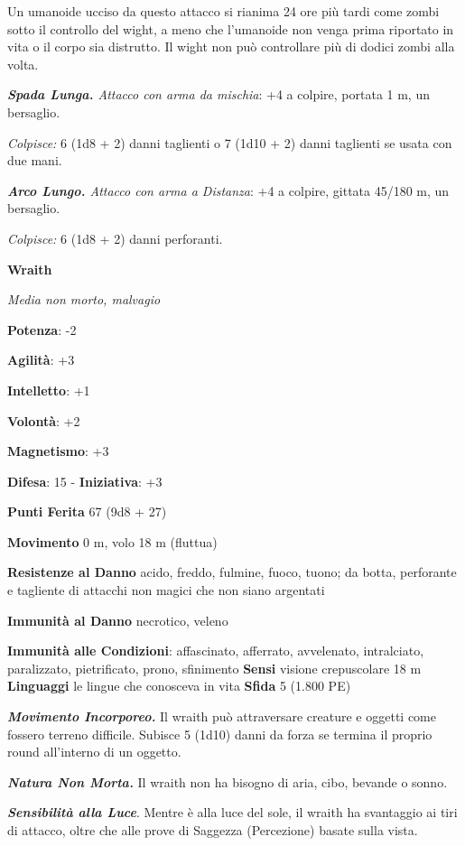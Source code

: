 \begin{multicols}{2}
Un umanoide ucciso da questo attacco si rianima 24 ore più tardi come
zombi sotto il controllo del wight, a meno che l'umanoide non venga
prima riportato in vita o il corpo sia distrutto. Il wight non può
controllare più di dodici zombi alla volta.

\emph{\textbf{Spada Lunga.} Attacco con arma da mischia}: +4 a colpire,
portata 1 m, un bersaglio.

\emph{Colpisce:} 6 (1d8 + 2) danni taglienti o 7 (1d10 + 2) danni
taglienti se usata con due mani.

\emph{\textbf{Arco Lungo.} Attacco con arma a Distanza}: +4 a colpire,
gittata 45/180 m, un bersaglio.

\emph{Colpisce:} 6 (1d8 + 2) danni perforanti.

\textbf{Wraith}

\emph{Media non morto, malvagio}

\textbf{Potenza}: -2

\textbf{Agilità}: +3

\textbf{Intelletto}: +1

\textbf{Volontà}: +2

\textbf{Magnetismo}: +3

\textbf{Difesa}: 15 - \textbf{Iniziativa}: +3

\textbf{Punti Ferita} 67 (9d8 + 27)

\textbf{Movimento} 0 m, volo 18 m (fluttua)

\textbf{Resistenze al Danno} acido, freddo, fulmine, fuoco, tuono;
da botta, perforante e tagliente di attacchi non magici che non siano
argentati

\textbf{Immunità al Danno} necrotico, veleno

\textbf{Immunità alle Condizioni}: affascinato, afferrato, avvelenato,
intralciato, paralizzato, pietrificato, prono, sfinimento \textbf{Sensi}
visione crepuscolare 18 m \textbf{Linguaggi} le lingue
che conosceva in vita \textbf{Sfida} 5 (1.800 PE)\smallskip

\emph{\textbf{Movimento Incorporeo.}} Il wraith può attraversare
creature e oggetti come fossero terreno difficile. Subisce 5 (1d10)
danni da forza se termina il proprio round all'interno di un oggetto.

\emph{\textbf{Natura Non Morta.}} Il wraith non ha bisogno di aria,
cibo, bevande o sonno.

\emph{\textbf{Sensibilità alla Luce}}. Mentre è alla luce del sole, il
wraith ha svantaggio ai tiri di attacco, oltre che alle prove di
Saggezza (Percezione) basate sulla vista.


\end{multicols}
